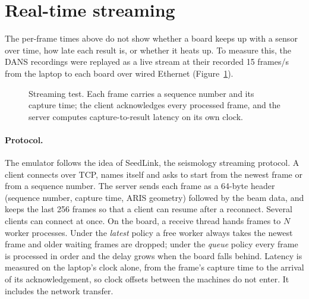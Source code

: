 \documentclass[11pt,a4paper]{article}
\begin{document}
\section{Real-time streaming}
\label{sec:stream}

The per-frame times above do not show whether a board keeps up with a
sensor over time, how late each result is, or whether it heats up. To
measure this, the DANS recordings were replayed as a live stream at their
recorded 15 frames/s from the laptop to each board over wired Ethernet
(Figure~\ref{fig:stream}).

\begin{figure}[H]
\centering
{}
\caption{Streaming test. Each frame carries a sequence number and its
capture time; the client acknowledges every processed frame, and the
server computes capture-to-result latency on its own clock.}
\label{fig:stream}
\end{figure}

\paragraph{Protocol.} The emulator follows the idea of SeedLink, the
seismology streaming protocol. A client connects over TCP, names itself and
asks to start from the newest frame or from a sequence number. The server
sends each frame as a 64-byte header (sequence number, capture time, ARIS
geometry) followed by the beam data, and keeps the last 256 frames so that
a client can resume after a reconnect. Several clients can connect at once.
On the board, a receive thread hands frames to $N$ worker processes. Under
the \emph{latest} policy a free worker always takes the newest frame and
older waiting frames are dropped; under the \emph{queue} policy every frame
is processed in order and the delay grows when the board falls behind.
Latency is measured on the laptop's clock alone, from the frame's capture
time to the arrival of its acknowledgement, so clock offsets between the
machines do not enter. It includes the network transfer.
\end{document}
